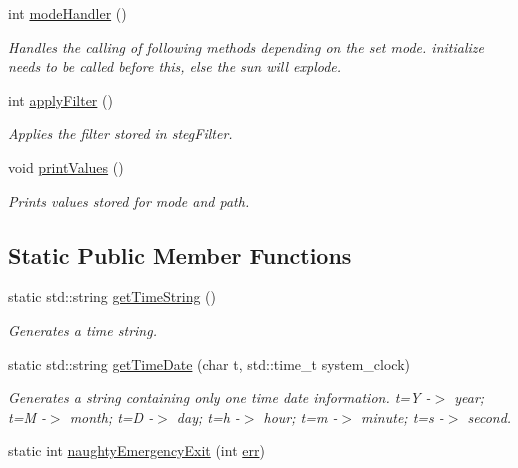 \begin{DoxyCompactItemize}
int \mbox{\hyperlink{classSteganoMessage_a2649e515941e730520b759282d00dcd6}{mode\+Handler}} ()
\begin{DoxyCompactList}\small\item\em Handles the calling of following methods depending on the set mode. initialize needs to be called before this, else the sun will explode. \end{DoxyCompactList}\item 
int \mbox{\hyperlink{classSteganoMessage_aec575d6949cf2eb49adefe2f1299d075}{apply\+Filter}} ()
\begin{DoxyCompactList}\small\item\em Applies the filter stored in steg\+Filter. \end{DoxyCompactList}\item 
void \mbox{\hyperlink{classSteganoMessage_a3ea3f5ff720bf56d33f168d47e2897b0}{print\+Values}} ()
\begin{DoxyCompactList}\small\item\em Prints values stored for mode and path. \end{DoxyCompactList}\end{DoxyCompactItemize}
\subsection*{Static Public Member Functions}
\begin{DoxyCompactItemize}
\item 
static std\+::string \mbox{\hyperlink{classSteganoMessage_a9771a4abc2d7a5a2a8cfb1684f7f313f}{get\+Time\+String}} ()
\begin{DoxyCompactList}\small\item\em Generates a time string. \end{DoxyCompactList}\item 
static std\+::string \mbox{\hyperlink{classSteganoMessage_a9aaa5e476220c95e1a68b4d722de43b1}{get\+Time\+Date}} (char t, std\+::time\+\_\+t system\+\_\+clock)
\begin{DoxyCompactList}\small\item\em Generates a string containing only one time date information. t=Y -\/$>$ year; t=M -\/$>$ month; t=D -\/$>$ day; t=h -\/$>$ hour; t=m -\/$>$ minute; t=s -\/$>$ second. \end{DoxyCompactList}\item 
static int \mbox{\hyperlink{classSteganoMessage_a1fb7ba8950baa17684874ef931850a9c}{naughty\+Emergency\+Exit}} (int \mbox{\hyperlink{classSteganoMessage_a26b631e00716be7a89cbcf22cf0b7291}{err}})
\end{DoxyCompactItemize}
